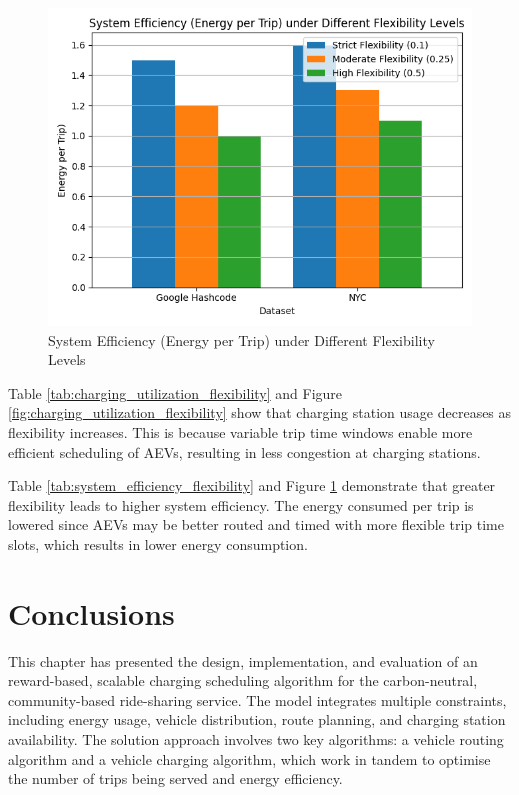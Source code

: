 \begin{figure}[h]
\centering
\includegraphics[scale=0.55]{Crest/Images/system_efficiency_flexibility.png}
\caption{System Efficiency (Energy per Trip) under Different Flexibility Levels}
\label{fig:system_efficiency_flexibility}
\end{figure}

Table \ref{tab:charging_utilization_flexibility} and Figure \ref{fig:charging_utilization_flexibility} show that charging station usage decreases as flexibility increases. This is because variable trip time windows enable more efficient scheduling of AEVs, resulting in less congestion at charging stations.

Table \ref{tab:system_efficiency_flexibility} and Figure \ref{fig:system_efficiency_flexibility} demonstrate that greater flexibility leads to higher system efficiency. The energy consumed per trip is lowered since AEVs may be better routed and timed with more flexible trip time slots, which results in lower energy consumption.

\section{Conclusions}
\label{sec:conclusions_and_future_work}

This chapter has presented the design, implementation, and evaluation of an reward-based, scalable charging scheduling algorithm for the carbon-neutral, community-based ride-sharing service. The model integrates multiple constraints, including energy usage, vehicle distribution, route planning, and charging station availability. The solution approach involves two key algorithms: a vehicle routing algorithm and a vehicle charging algorithm, which work in tandem to optimise the number of trips being served and energy efficiency.

